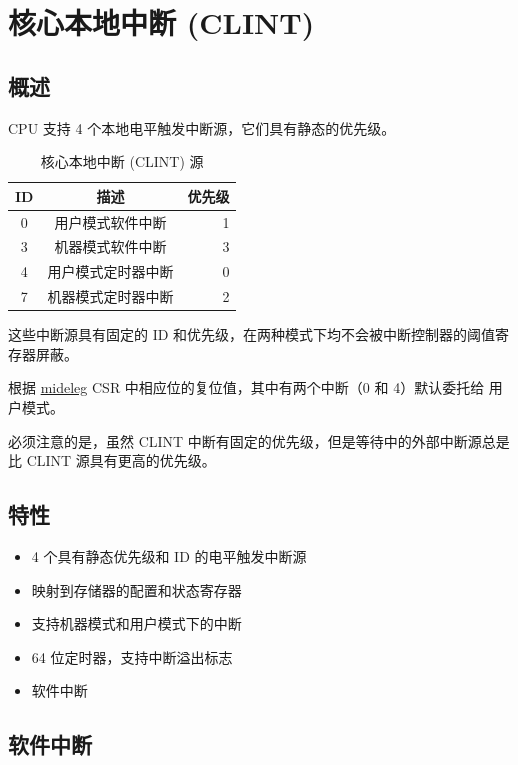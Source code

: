 \documentclass[main\_\_CN.tex]{subfiles}
\begin{document}
\clearpage
\section{核心本地中断 (CLINT)}
\label{sec:riscvcpu-clint}

\subsection{概述}
\label{sec:riscvcpu-clint-overview}

CPU 支持 4 个本地电平触发中断源，它们具有静态的优先级。

\begin{longtable}{ | c | c | r | }
\caption{核心本地中断 (CLINT) 源} \label{tab:riscvcpu-clint-table}
\\ \hline
\rowcolor{lightgray}
ID & 描述 & 优先级 \\ \hline
0 & 用户模式软件中断 & 1 \\ \hline
3 & 机器模式软件中断 & 3 \\ \hline
4 & 用户模式定时器中断 & 0 \\ \hline
7 & 机器模式定时器中断 & 2 \\ \hline
\end{longtable}

这些中断源具有固定的 ID 和优先级，在两种模式下均不会被中断控制器的阈值寄存器屏蔽。

根据 \hyperref[regdesc:MIDELEG]{mideleg} CSR 中相应位的复位值，其中有两个中断（0 和 4）默认委托给 用户模式。

必须注意的是，虽然 CLINT 中断有固定的优先级，但是等待中的外部中断源总是比 CLINT 源具有更高的优先级。

\subsection{特性}
\begin{itemize}
     \item 4 个具有静态优先级和 ID 的电平触发中断源
     \item 映射到存储器的配置和状态寄存器
     \item 支持机器模式和用户模式下的中断
     \item 64 位定时器，支持中断溢出标志
     \item 软件中断
\end{itemize}

\subsection{软件中断}
\label{sec:riscvcpu-clint-software}
\end{document}
